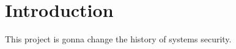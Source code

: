 \documentclass[12pt]{article}
\begin{document}
%
\section{Introduction}
%
This project is gonna change the history of systems security. 
%
%
%
%
%
%
%
%
%
%
%
%
\end{document}
